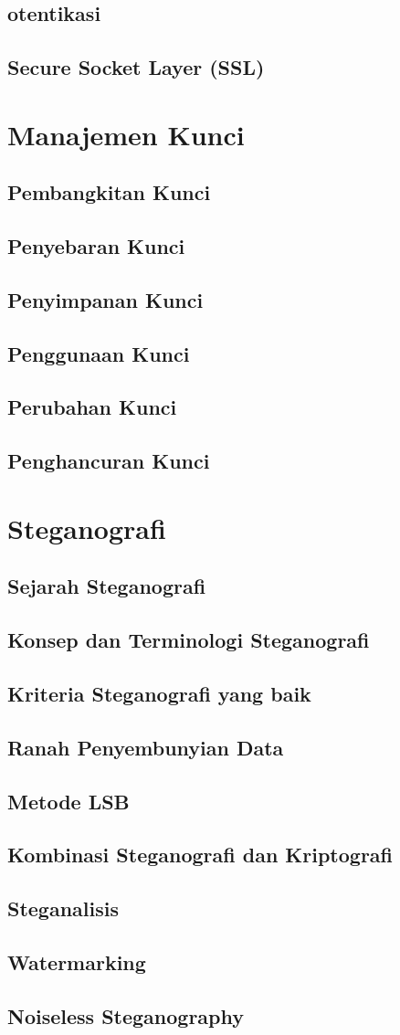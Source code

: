 \documentclass{book}
\begin{document}
     \section{otentikasi}
     \section{Secure Socket Layer (SSL)}
\chapter{Manajemen Kunci}
     \section{Pembangkitan Kunci}
     \section{Penyebaran Kunci}
     \section{Penyimpanan Kunci}
     \section{Penggunaan Kunci}
     \section{Perubahan Kunci}
     \section{Penghancuran Kunci}
\chapter{Steganografi}
     \section{Sejarah Steganografi}
     \section{Konsep dan Terminologi Steganografi}
     \section{Kriteria Steganografi yang baik}
     \section{Ranah Penyembunyian Data}
     \section{Metode LSB}
     \section{Kombinasi Steganografi dan Kriptografi}
     \section{Steganalisis}
     \section{Watermarking}
     \section{Noiseless Steganography}
\end{document}
